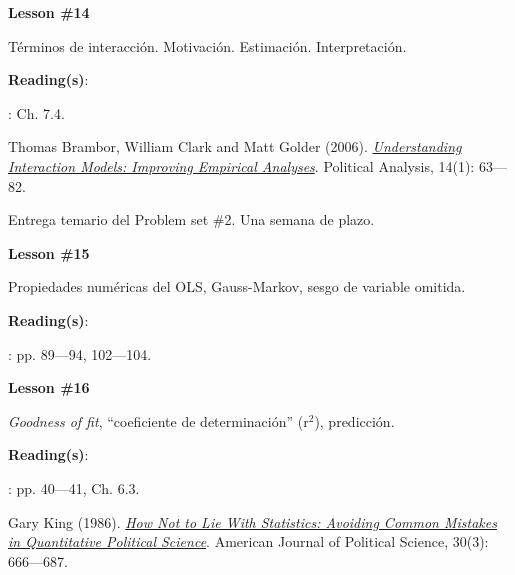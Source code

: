 \documentclass[letterpaper]{article}
\renewenvironment{itemize}{
  \begin{list}{}{
    \setlength{\leftmargin}{1.5em}
  }
}{
  \end{list}
}
\begin{document}
\begin{enumerate}
			\begin{itemize} 
				\item[$\bullet$] {\bf Lesson \#14}
					\begin{itemize} 
						\item[$\circ$] T\'erminos de interacci\'on. Motivaci\'on. Estimaci\'on. Interpretaci\'on.  
						\item[$\circ$] {\bf Reading(s)}: 
							\begin{itemize}
								\item[$\diamond$] \textcite{Wooldridge2010}: Ch. 7.4.
								\item[$\diamond$] Thomas Brambor, William Clark and Matt Golder (2006). \href{https://github.com/hbahamonde/OLS/raw/master/Readings/Brambor_et_al.pdf}{\emph{Understanding Interaction Models: Improving Empirical Analyses}}. Political Analysis, 14(1): 63---82.
							\end{itemize}
					\end{itemize}
			\end{itemize}

\item[{\color{red}\Pointinghand}] Entrega temario del Problem set \#2. Una semana de plazo.


			\begin{itemize} 
				\item[$\bullet$] {\bf Lesson \#15}
					\begin{itemize} 
						\item[$\circ$] Propiedades num\'ericas del OLS, Gauss-Markov, sesgo de variable omitida. %
						\item[$\circ$] {\bf Reading(s)}: 
							\begin{itemize} 
								\item[$\diamond$] \textcite{Wooldridge2010}: pp. 89---94, 102---104.
							\end{itemize}
					\end{itemize}
			\end{itemize}



			\begin{itemize} 
				\item[$\bullet$] {\bf Lesson \#16}
					\begin{itemize} 
						\item[$\circ$] \emph{Goodness of fit}, ``coeficiente de determinaci\'on'' (r$^2$), predicci\'on. 
						\item[$\circ$] {\bf Reading(s)}:
							\begin{itemize} 
								\item[$\diamond$] \textcite{Wooldridge2010}: pp. 40---41, Ch. 6.3.
								\item[$\diamond$] Gary King (1986). \href{https://github.com/hbahamonde/OLS/raw/master/Readings/King.pdf}{\emph{How Not to Lie With Statistics: Avoiding Common Mistakes in Quantitative Political Science}}. American Journal of Political Science, 30(3): 666---687.


\end{itemize}
\end{itemize}
\end{itemize}
\end{enumerate}
\end{document}
